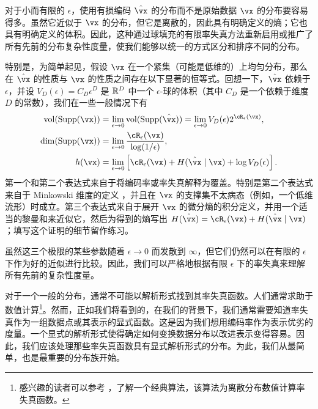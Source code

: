 \documentclass[../../book-main.tex]{subfiles}
\begin{document}
\begin{remark}
	对于小而有限的 \(\epsilon\)，使用有损编码 \(\hat \vx\) 的分布而不是原始数据 \(\vx\) 的分布要容易得多。虽然它近似于 \(\vx\) 的分布，但它是离散的，因此具有明确定义的熵；它也具有明确定义的体积。因此，这种通过球填充的有限率失真方法重新启用或推广了所有先前的分布复杂性度量，使我们能够以统一的方式区分和排序不同的分布。

	特别是，为简单起见，假设 \(\vx\) 在一个紧集（可能是低维的）上均匀分布，那么在 \(\hat{\vx}\) 的性质与 \(\vx\) 的性质之间存在以下显著的恒等式。回想一下，\(\hat{\vx}\) 依赖于 \(\epsilon\)，并设 \(V_{D}(\epsilon) = C_{D}\epsilon^{D}\) 是 \(\mathbb{R}^{D}\) 中一个 \(\epsilon\)-球的体积（其中 \(C_{D}\) 是一个依赖于维度 \(D\) 的常数），我们在一些一般情况下有
	\begin{align}
		\operatorname{vol}(\Supp(\vx))
		&= \lim_{\epsilon \to 0}\operatorname{vol}(\Supp(\hat \vx)) = \lim_{\epsilon \to 0}V_{D}(\epsilon)2^{\cR_{\epsilon}(\vx)}, \\
		\dim(\Supp(\vx))
		&= \lim_{\epsilon \to 0}\frac{\cR_{\epsilon}(\vx)}{\log(1/\epsilon)}, \\
		h(\vx)
		&= \lim_{\epsilon \to 0}\bs{\cR_{\epsilon}(\vx) + H(\hat{\vx} \mid \vx) + \log V_{D}(\epsilon)}.
	\end{align}
	第一个和第二个表达式来自于将编码率或率失真解释为覆盖。特别是第二个表达式来自于 Minkowski 维度的定义 \citep{bishop2017fractals}，并且在 \(\vx\) 的支撑集不太病态（例如，一个低维流形）时成立。第三个表达式来自于展开 \(\vx\) 的微分熵的积分定义，并用一个适当的黎曼和来近似它，然后为得到的熵写出 \(H(\hat{\vx}) = \cR_{\epsilon}(\vx) + H(\hat{\vx} \mid \vx)\)；填写这个证明的细节留作练习。

	虽然这三个极限的某些参数随着 \(\epsilon \to 0\) 而发散到 \(\infty\)，但它们仍然可以在有限的 \(\epsilon\) 下作为好的近似进行比较。因此，我们可以严格地根据有限 \(\epsilon\) 下的率失真来理解所有先前的复杂性度量。
\end{remark}

对于一个一般的分布，通常不可能以解析形式找到其率失真函数。人们通常求助于数值计算\footnote{感兴趣的读者可以参考 \cite{Blahut-1972}，了解一个经典算法，该算法为离散分布数值计算率失真函数。}。然而，正如我们将看到的，在我们的背景下，我们通常需要知道率失真作为一组数据点或其表示的显式函数。这是因为我们想用编码率作为表示优劣的度量。一个显式的解析形式使得确定如何变换数据分布以改进表示变得容易。因此，我们应该处理那些率失真函数具有显式解析形式的分布。为此，我们从最简单，也是最重要的分布族开始。
\end{document}
